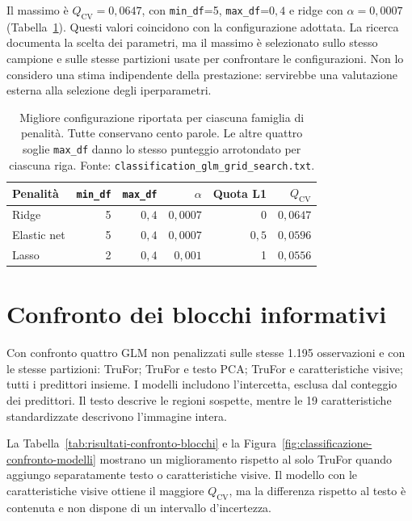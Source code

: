 Il massimo è $Q_{\mathrm{CV}}=0{,}0647$, con \texttt{min\_df}=5, \texttt{max\_df}=$0{,}4$ e ridge con $\alpha=0{,}0007$ (Tabella~\ref{tab:associazione-grid-risultati}). Questi valori coincidono con la configurazione adottata. La ricerca documenta la scelta dei parametri, ma il massimo è selezionato sullo stesso campione e sulle stesse partizioni usate per confrontare le configurazioni. Non lo considero una stima indipendente della prestazione: servirebbe una valutazione esterna alla selezione degli iperparametri.

\begin{table}[htbp]
    \centering\small
    \caption{Migliore configurazione riportata per ciascuna famiglia di penalità. Tutte conservano cento parole. Le altre quattro soglie \texttt{max\_df} danno lo stesso punteggio arrotondato per ciascuna riga. Fonte: \texttt{classification\_glm\_grid\_search.txt}.}
    \label{tab:associazione-grid-risultati}
    \begin{tabular}{@{}lrrrrr@{}}
        \toprule
        Penalità & \texttt{min\_df} & \texttt{max\_df} & $\alpha$ & Quota L1 & $Q_{\mathrm{CV}}$ \\
        \midrule
        Ridge & 5 & $0{,}4$ & $0{,}0007$ & 0 & $0{,}0647$ \\
        Elastic net & 5 & $0{,}4$ & $0{,}0007$ & $0{,}5$ & $0{,}0596$ \\
        Lasso & 2 & $0{,}4$ & $0{,}001$ & 1 & $0{,}0556$ \\
        \bottomrule
    \end{tabular}
\end{table}

\section{Confronto dei blocchi informativi}
\label{sec:associazione-confronto-blocchi}

Con  confronto quattro GLM non penalizzati sulle stesse 1.195 osservazioni e con le stesse partizioni: TruFor; TruFor e testo PCA; TruFor e caratteristiche visive; tutti i predittori insieme. I modelli includono l'intercetta, esclusa dal conteggio dei predittori. Il testo descrive le regioni sospette, mentre le 19 caratteristiche standardizzate descrivono l'immagine intera.

La Tabella~\ref{tab:risultati-confronto-blocchi} e la Figura~\ref{fig:classificazione-confronto-modelli} mostrano un miglioramento rispetto al solo TruFor quando aggiungo separatamente testo o caratteristiche visive. Il modello con le caratteristiche visive ottiene il maggiore $Q_{\mathrm{CV}}$, ma la differenza rispetto al testo è contenuta e non dispone di un intervallo d'incertezza.

